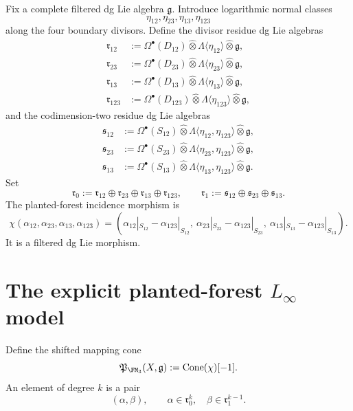 Fix a complete filtered dg Lie algebra $\mathfrak g$. Introduce logarithmic
normal classes
\[
\eta_{12},\eta_{23},\eta_{13},\eta_{123}
\]
along the four boundary divisors. Define the divisor residue dg Lie algebras
\begin{align*}
\mathfrak r_{12} &:= \Omega^\bullet(D_{12})\widehat\otimes \Lambda\langle\eta_{12}\rangle\widehat\otimes \mathfrak g,\\
\mathfrak r_{23} &:= \Omega^\bullet(D_{23})\widehat\otimes \Lambda\langle\eta_{23}\rangle\widehat\otimes \mathfrak g,\\
\mathfrak r_{13} &:= \Omega^\bullet(D_{13})\widehat\otimes \Lambda\langle\eta_{13}\rangle\widehat\otimes \mathfrak g,\\
\mathfrak r_{123} &:= \Omega^\bullet(D_{123})\widehat\otimes \Lambda\langle\eta_{123}\rangle\widehat\otimes \mathfrak g,
\end{align*}
and the codimension-two residue dg Lie algebras
\begin{align*}
\mathfrak s_{12} &:= \Omega^\bullet(S_{12})\widehat\otimes \Lambda\langle\eta_{12},\eta_{123}\rangle\widehat\otimes \mathfrak g,\\
\mathfrak s_{23} &:= \Omega^\bullet(S_{23})\widehat\otimes \Lambda\langle\eta_{23},\eta_{123}\rangle\widehat\otimes \mathfrak g,\\
\mathfrak s_{13} &:= \Omega^\bullet(S_{13})\widehat\otimes \Lambda\langle\eta_{13},\eta_{123}\rangle\widehat\otimes \mathfrak g.
\end{align*}
Set
\[
\mathfrak r_0:=\mathfrak r_{12}\oplus\mathfrak r_{23}\oplus\mathfrak r_{13}\oplus\mathfrak r_{123},
\qquad
\mathfrak r_1:=\mathfrak s_{12}\oplus\mathfrak s_{23}\oplus\mathfrak s_{13}.
\]
The planted-forest incidence morphism is
\[
\chi(\alpha_{12},\alpha_{23},\alpha_{13},\alpha_{123})
=
(\alpha_{12}|_{S_{12}}-\alpha_{123}|_{S_{12}},\
 \alpha_{23}|_{S_{23}}-\alpha_{123}|_{S_{23}},\
 \alpha_{13}|_{S_{13}}-\alpha_{123}|_{S_{13}}).
\]
It is a filtered dg Lie morphism.

\section{The explicit planted-forest \texorpdfstring{$L_\infty$}{L-infinity} model}

Define the shifted mapping cone
\[
\mathfrak P_{\FM_3}(X,\mathfrak g):=\Cone(\chi)[-1].
\]
An element of degree $k$ is a pair
\[
(\alpha,\beta),\qquad \alpha\in \mathfrak r_0^k,\quad \beta\in \mathfrak r_1^{k-1}.
\]

